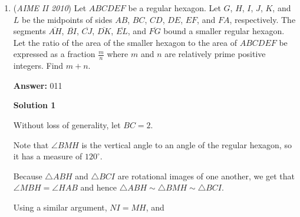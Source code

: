 \begin{enumerate}
 Case 5: Set A has 5 elements. Set B has 7 elements. 7 must be in set A, and 5 must not be in set A, so there is $1\cdot\binom{10}{4}$ (for the remaining element).

 There is no Case 6 because $6$ can't go in set A and can't go in set B. Cases 7 to 11 are symmetric, so add up the 5 cases and multiply by $2$ to get $\boxed{772}$.

 -unhappyfarmer

 
            \begin{itemize}
        \item Note by Voidling: After the first couple of cases, you may be able to find a pattern, where case n has $\binom{10}{n-1}$ possibilities, so you could just find $2\cdot\sum_{n=1}^{5}\binom{10}{n-1}$. This can be proved because for each case, if set A has $n$ elements, then out of these n elements, one of which must be $12-n$, there are 10 choices remaining, as none of the elements may equal $n$ either. Therefore, if A has n elements, then there are $\binom{10}{n-1}$ different possibilities for set A.
            \end{itemize}
            


	\item (\textit{AIME II 2010}) Let $ABCDEF$ be a regular hexagon. Let $G$, $H$, $I$, $J$, $K$, and $L$ be the midpoints of sides $AB$, $BC$, $CD$, $DE$, $EF$, and $FA$, respectively. The segments $\overline{AH}$, $\overline{BI}$, $\overline{CJ}$, $\overline{DK}$, $\overline{EL}$, and $\overline{FG}$ bound a smaller regular hexagon. Let the ratio of the area of the smaller hexagon to the area of $ABCDEF$ be expressed as a fraction $\frac {m}{n}$ where $m$ and $n$ are relatively prime positive integers. Find $m + n$.


 
 \textbf{Answer: }011



\textbf{Solution 1}

Without loss of generality, let $BC=2.$

 Note that $\angle BMH$ is the vertical angle to an angle of the regular hexagon, so it has a measure of $120^\circ$.

 Because $\triangle ABH$ and $\triangle BCI$ are rotational images of one another, we get that $\angle{MBH}=\angle{HAB}$ and hence $\triangle ABH \sim \triangle BMH \sim \triangle BCI$.

 Using a similar argument, $NI=MH$, and


\end{enumerate}
